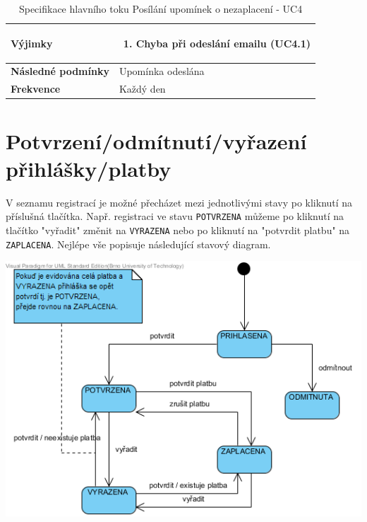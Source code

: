 \documentclass[12pt,a4paper,titlepage,final]{report}
\begin{document}
\begin{table}[h!]
\begin{center}
\begin{tabular}{ | p{4.2cm} | p{12.2cm} | }
    \textbf{Výjimky} & 
    \vspace{-3.5mm}
    \begin{enumerate}
		\itemsep0em 
		\item Chyba při odeslání emailu (UC4.1)
	\end{enumerate}
    \\ \hline 
        
    \textbf{Následné podmínky} & Upomínka odeslána
    \\ \hline    
    
	\textbf{Frekvence} & Každý den
	\\ \hline		
    \end{tabular}
	\end{center}	
	\caption{Specifikace hlavního toku Posílání upomínek o nezaplacení - UC4}  
\end{table}



\section{Potvrzení/odmítnutí/vyřazení přihlášky/platby}

V seznamu registrací je možné přecházet mezi jednotlivými stavy po kliknutí na příslušná tlačítka. Např. registraci ve stavu \verb|POTVRZENA| můžeme po kliknutí na tlačítko "vyřadit" změnit na \verb|VYRAZENA| nebo po kliknutí na "potvrdit platbu" na \verb|ZAPLACENA|. Nejlépe vše popisuje následující stavový diagram.

\begin{center}
	\captionsetup{type=figure}
	\includegraphics{img/prihlaska-stavy.png}
\end{center}
\end{document}
